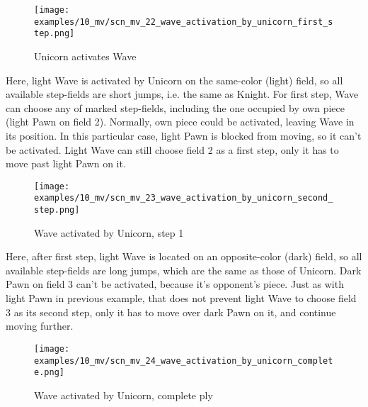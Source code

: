\clearpage %

\vspace*{-2.1\baselineskip}
\noindent
\begin{figure}[!h]
\texttt{[image: examples/10\_mv/scn\_mv\_22\_wave\_activation\_by\_unicorn\_first\_step.png]}
\vspace*{-1.3\baselineskip}
\caption{Unicorn activates Wave}
\label{fig:scn_mv_22_wave_activation_by_unicorn_first_step}
\end{figure}

\vspace*{-0.3\baselineskip}
Here, light Wave is activated by Unicorn on the same-color (light) field, so all available
step-fields are short jumps, i.e. the same as Knight. For first step, Wave can choose any of
marked step-fields, including the one occupied by own piece (light Pawn on field 2). Normally,
own piece could be activated, leaving Wave in its position. In this particular case, light Pawn
is blocked from moving, so it can't be activated. Light Wave can still choose field 2 as a first
step, only it has to move past light Pawn on it.

\clearpage %

\vspace*{-2.1\baselineskip}
\noindent
\begin{figure}[!h]
\texttt{[image: examples/10\_mv/scn\_mv\_23\_wave\_activation\_by\_unicorn\_second\_step.png]}
\caption{Wave activated by Unicorn, step 1}
\label{fig:scn_mv_23_wave_activation_by_unicorn_second_step}
\end{figure}

Here, after first step, light Wave is located on an opposite-color (dark) field, so all available
step-fields are long jumps, which are the same as those of Unicorn. Dark Pawn on field 3 can't be
activated, because it's opponent's piece. Just as with light Pawn in previous example, that does
not prevent light Wave to choose field 3 as its second step, only it has to move over dark Pawn
on it, and continue moving further.

\clearpage %

\vspace*{-2.1\baselineskip}
\noindent
\begin{figure}[!h]
\texttt{[image: examples/10\_mv/scn\_mv\_24\_wave\_activation\_by\_unicorn\_complete.png]}
\caption{Wave activated by Unicorn, complete ply}
\label{fig:scn_mv_24_wave_activation_by_unicorn_complete}
\end{figure}

